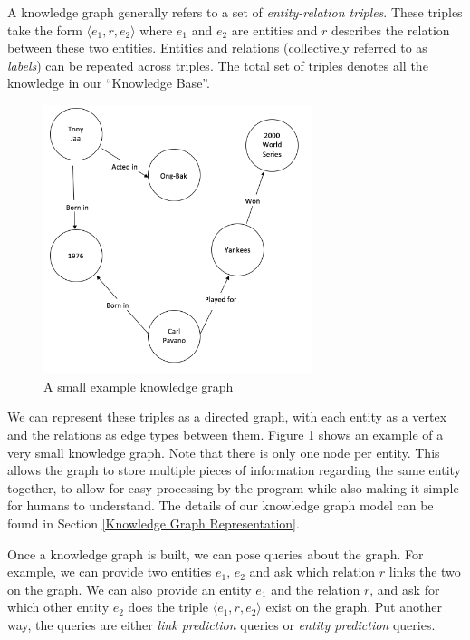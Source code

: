 \documentclass[pageno]{final_paper}
\begin{document}
A knowledge graph generally refers to a set of \textit{entity-relation triples}.
These triples take the form $\langle e_1, r, e_2 \rangle$ where $e_1$ and $e_2$
are entities and $r$ describes the relation between these two entities. Entities
and relations (collectively referred to as \textit{labels}) can be repeated
across triples. The total set of triples denotes all the knowledge in our
``Knowledge Base''.

\begin{figure}[!tb]
    \centering
    \includegraphics[width=0.7\textwidth,keepaspectratio]{figures/Example_KG.png}
    \caption{A small example knowledge graph}
    \label{fig: KG}
\end{figure}

We can represent these triples as a directed graph, with each entity as a vertex
and the relations as edge types between them. Figure \ref{fig: KG} shows an
example of a very small knowledge graph. Note that there is only one node per
entity. This allows the graph to store multiple pieces of information regarding
the same entity together, to allow for easy processing by the program while also
making it simple for humans to understand. The details of our knowledge graph
model can be found in Section \ref{Knowledge Graph Representation}.

Once a knowledge graph is built, we can pose queries about the graph. For
example, we can provide two entities $e_1$, $e_2$ and ask which relation $r$
links the two on the graph. We can also provide an entity $e_1$ and the relation
$r$, and ask for which other entity $e_2$ does the triple $\langle e_1,r,e_2
\rangle$ exist on the graph. Put another way, the queries are either
\textit{link prediction} queries or \textit{entity prediction} queries.
\end{document}
